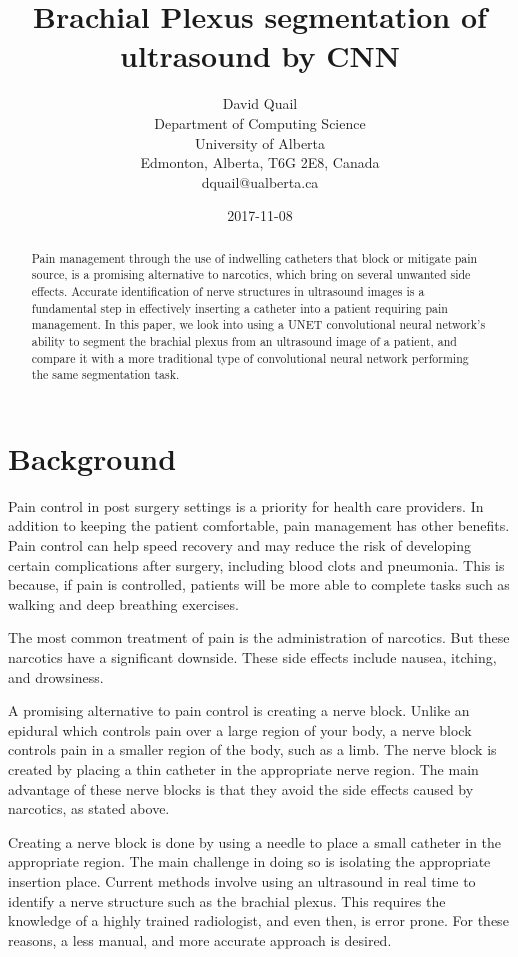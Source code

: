 \documentclass[letterpaper]{article}
\title{Brachial Plexus segmentation of ultrasound by CNN}
\date{2017-11-08}
\author{David Quail\\
Department of Computing Science \\ University of Alberta \\
Edmonton, Alberta, T6G 2E8, Canada \\
dquail@ualberta.ca}
\begin{document}
\maketitle
\begin{abstract}
Pain management through the use of indwelling catheters that block or mitigate pain source, is a promising alternative to narcotics, which bring on several unwanted side effects. Accurate identification of nerve structures in ultrasound images is a fundamental step in effectively inserting a catheter into a patient requiring pain management. In this paper, we look into using a UNET \cite{ronneberger2015u} convolutional neural network's ability to segment the brachial plexus from an ultrasound image of a patient, and compare it with a more traditional type of convolutional neural network performing the same segmentation task. 
\end{abstract}
    
\section{Background}

Pain control in post surgery settings is a priority for health care providers. In addition to keeping the patient comfortable, pain management has other benefits. Pain control can help speed recovery and may reduce the risk of developing certain complications after surgery, including blood clots and pneumonia. This is because, if pain is controlled, patients will be more able to complete tasks such as walking and deep breathing exercises.

The most common treatment of pain is the administration of narcotics. But these narcotics have a significant downside. These side effects include nausea, itching, and drowsiness. 

A promising alternative to pain control is creating a nerve block. Unlike an epidural which controls pain over a large region of your body, a nerve block controls pain in a smaller region of the body, such as a limb. The nerve block is created by placing a thin catheter in the appropriate nerve region. The main advantage of these nerve blocks is that they avoid the side effects caused by narcotics, as stated above.

Creating a nerve block is done by using a needle to place a small catheter in the appropriate region. The main challenge in doing so is isolating the appropriate insertion place. Current methods involve using an ultrasound in real time to identify a nerve structure such as the brachial plexus. This requires the knowledge of a highly trained radiologist, and even then, is error prone. For these reasons, a less manual, and more accurate approach is desired. 
\end{document}
